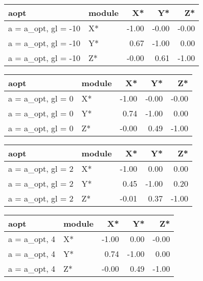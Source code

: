 \documentclass[10pt,a4paper]{article}
\begin{document}
\begin{table}[ht]
\centering
\begin{tabular}{llrrr}
  \hline
aopt & module & X* & Y* & Z* \\ 
  \hline
a = a\_opt, gl = -10 & X* & -1.00 & -0.00 & -0.00 \\ 
  a = a\_opt, gl = -10 & Y* & 0.67 & -1.00 & 0.00 \\ 
  a = a\_opt, gl = -10 & Z* & -0.00 & 0.61 & -1.00 \\ 
   \hline
\end{tabular}
\end{table}


\begin{table}[ht]
\centering
\begin{tabular}{llrrr}
  \hline
aopt & module & X* & Y* & Z* \\ 
  \hline
a = a\_opt, gl = 0 & X* & -1.00 & -0.00 & -0.00 \\ 
  a = a\_opt, gl = 0 & Y* & 0.74 & -1.00 & 0.00 \\ 
  a = a\_opt, gl = 0 & Z* & -0.00 & 0.49 & -1.00 \\ 
   \hline
\end{tabular}
\end{table}


\begin{table}[ht]
\centering
\begin{tabular}{llrrr}
  \hline
aopt & module & X* & Y* & Z* \\ 
  \hline
a = a\_opt, gl = 2 & X* & -1.00 & 0.00 & 0.00 \\ 
  a = a\_opt, gl = 2 & Y* & 0.45 & -1.00 & 0.20 \\ 
  a = a\_opt, gl = 2 & Z* & -0.01 & 0.37 & -1.00 \\ 
   \hline
\end{tabular}
\end{table}


\begin{table}[ht]
\centering
\begin{tabular}{llrrr}
  \hline
aopt & module & X* & Y* & Z* \\ 
  \hline
a = a\_opt, 4 & X* & -1.00 & 0.00 & -0.00 \\ 
  a = a\_opt, 4 & Y* & 0.74 & -1.00 & 0.00 \\ 
  a = a\_opt, 4 & Z* & -0.00 & 0.49 & -1.00 \\ 
   \hline
\end{tabular}
\end{table}
\end{document}
